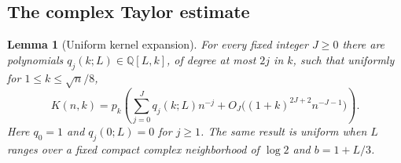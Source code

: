 \documentclass[11pt,letterpaper]{article}
\newtheorem{lemma}[theorem]{Lemma}
\theoremstyle{definition}\newtheorem{definition}[theorem]{Definition}
\theoremstyle{remark}\newtheorem{remark}[theorem]{Remark}
\newcommand{\Q}{\mathbb Q}
\begin{document}
\subsection{The complex Taylor estimate}
\begin{lemma}[Uniform kernel expansion]\label{spc:lem:kernel}
For every fixed integer $J\ge0$ there are polynomials
$q_j(k;L)\in\Q[L,k]$, of degree at most $2j$ in $k$, such that uniformly for $1\le k\le\sqrt n/8$,
\begin{equation}\label{spc:eq:kernelexp}
 K(n,k)=p_k\left(\sum_{j=0}^Jq_j(k;L)n^{-j}
       +O_J\bigl((1+k)^{2J+2}n^{-J-1}\bigr)\right).
\end{equation}
Here $q_0=1$ and $q_j(0;L)=0$ for $j\ge1$. The same result is uniform when $L$ ranges over a fixed compact complex neighborhood of $\log2$ and $b=1+L/3$.
\end{lemma}
\end{document}
